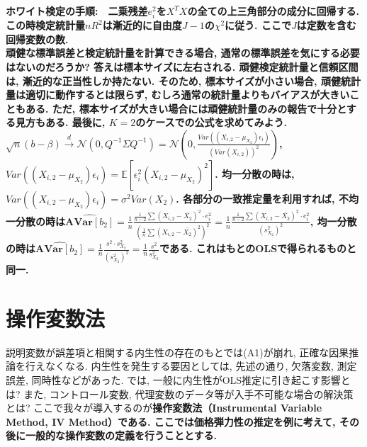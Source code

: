 \documentclass[paper=a4paper,fontsize=10pt]{jlreq}
\begin{document}
\rmfamily\mcfamily\bfseries{ホワイト検定の手順}\mdseries :　二乗残差$e_i^2$を$X^T X$の全ての上三角部分の成分に回帰する. この時検定統計量$nR^2$は漸近的に自由度$J-1$の$\chi^2$に従う. ここで$J$は定数を含む回帰変数の数.\\

頑健な標準誤差と検定統計量を計算できる場合, 通常の標準誤差を気にする必要はないのだろうか? 答えは標本サイズに左右される. 頑健検定統計量と信頼区間は, 漸近的な正当性しか持たない. そのため, 標本サイズが小さい場合, 頑健統計量は適切に動作するとは限らず, むしろ通常の統計量よりもバイアスが大きいこともある. ただ, 標本サイズが大きい場合には頑健統計量のみの報告で十分とする見方もある. 最後に, $K=2$のケースでの公式を求めてみよう. $\sqrt{n}({b}-\beta) \overset{d}{\to} \mathcal{N}({0}, Q^{-1}\Sigma Q^{-1}) = \mathcal{N}({0}, \frac{Var((X_{i,2}-\mu_{X_2})\epsilon_i)}{(Var(X_{i,2}))^2})$, $Var((X_{i,2}-\mu_{X_2})\epsilon_i)=\mathbb{E}[\epsilon_i^2(X_{i,2}-\mu_{X_2})^2]$. 均一分散の時は, $Var((X_{i,2}-\mu_{X_2})\epsilon_i)=\sigma^2 Var(X_2)$. 各部分の一致推定量を利用すれば, 不均一分散の時は$\hat{\mathbf{\text{AVar}}[b_2]}=\frac{1}{n}\frac{\frac{1}{n-2}\sum(X_{i,2}-\bar{X_2})^2\cdot e_i^2}{(\frac{1}{n}\sum(X_{i,2}-\bar{X_2})^2)^2} = \frac{1}{n}\frac{\frac{1}{n-2}\sum(X_{i,2}-\bar{X_2})^2\cdot e_i^2}{(s_{X_2}^2)^2}$, 均一分散の時は$\hat{\mathbf{\text{AVar}}[b_2]} = \frac{1}{n}\frac{s^2\cdot s_{X_2}^2}{(s_{X_2}^2)^2} = \frac{1}{n}\frac{s^2}{s_{X_2}^2}$である. これはもとのOLSで得られるものと同一.\\

\section{操作変数法}
説明変数が誤差項と相関する内生性の存在のもとでは(A1)が崩れ, 正確な因果推論を行えなくなる. 内生性を発生する要因としては, 先述の通り, 欠落変数, 測定誤差, 同時性などがあった. では, 一般に内生性がOLS推定に引き起こす影響とは? また, コントロール変数, 代理変数のデータ等が入手不可能な場合の解決策とは? ここで我々が導入するのが\rmfamily\mcfamily\bfseries{操作変数法（Instrumental Variable Method, IV Method）}\mdseries である. ここでは価格弾力性の推定を例に考えて, その後に一般的な操作変数の定義を行うこととする.\\
\end{document}
